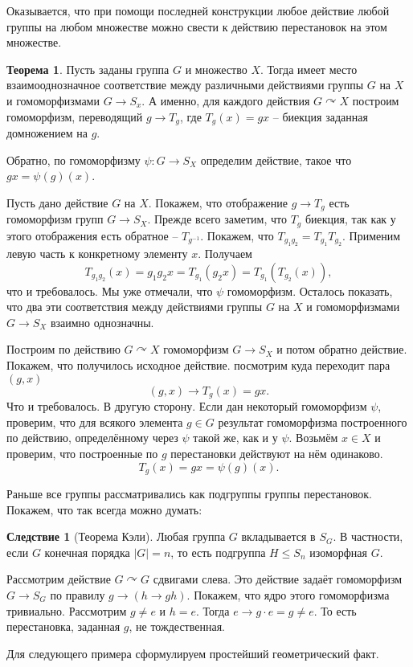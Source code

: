\documentclass[10pt,a4paper,oneside]{book}
\theoremstyle{definition}
\newtheorem{thm}{\color{red!40!black}Теорема}
\newtheorem{cor}{\color{green!45!black}Следствие}
\renewcommand{\leq}{\leqslant}
\def\thrm{\begin{thm}}
\def\ethrm{\end{thm}}
\def\crl{\begin{cor}}
\def\ecrl{\end{cor}}
\begin{document}
Оказывается, что при помощи последней конструкции любое действие любой группы на любом множестве можно свести к действию перестановок на этом множестве.


\thrm
Пусть заданы группа $G$ и множество $X$. Тогда имеет место взаимооднозначное соответствие между различными действиями группы $G$ на $X$ и  гомоморфизмами $G \to S_x$. А именно, для каждого действия $G \curvearrowright X$ построим гомоморфизм, переводящий $g \to T_g$, где $T_g(x)=gx$ -- биекция заданная домножением на $g$. 

Обратно, по гомоморфизму $\psi \colon G \to S_X$ определим действие, такое что $gx=\psi(g)(x)$.
\ethrm
\proof
Пусть дано действие $G$ на $X$. Покажем, что отображение $g \to T_g$ есть гомоморфизм групп $G \to S_X$.  Прежде всего заметим, что $T_g$ биекция, так как у этого отображения есть обратное -- $T_{g^{-1}}$. 
Покажем, что $T_{g_1g_2}=T_{g_1}T_{g_2}$. Применим  левую часть к конкретному элементу $x$. Получаем $$T_{g_1g_2}(x)=g_1g_2x=T_{g_1}(g_2x)=T_{g_1}(T_{g_2}(x)),$$
что и требовалось. Мы уже отмечали, что $\psi$ гомоморфизм. Осталось показать, что два эти соответствия между действиями группы $G$ на $X$ и гомоморфизмами $G \to S_X$ взаимно однозначны. 

Построим по действию $G \curvearrowright X$ гомоморфизм $G \to S_X$ и потом обратно действие. Покажем, что получилось исходное действие. посмотрим куда переходит пара $(g,x)$
$$(g,x) \to T_g(x)=gx.$$
Что и требовалось. В другую сторону. Если дан некоторый гомоморфизм $\psi$, проверим, что для всякого элемента $g\in G$ результат гомоморфизма построенного по действию, определённому через $\psi$ такой же, как и у $\psi$. Возьмём $x\in X$ и проверим, что построенные по $g$ перестановки действуют на нём одинаково. 
$$T_g(x)=gx=\psi(g)(x).$$
\endproof

Раньше все группы рассматривались как подгруппы группы перестановок. Покажем, что так всегда можно думать:

\crl[Теорема Кэли] Любая  группа $G$ вкладывается в $S_G$. В частности, если $G$ конечная порядка $|G|=n$, то есть подгруппа  $H \leq S_n$ изоморфная $G$.
\ecrl
\proof Рассмотрим действие $G \curvearrowright G$ сдвигами слева. Это действие задаёт гомоморфизм $G \to S_G$ по правилу $g\to (h \to gh)$. Покажем, что ядро этого гомоморфизма тривиально. Рассмотрим $g\neq e$ и $h=e$. Тогда $e \to g\cdot e=g \neq e$. То есть перестановка, заданная $g$, не тождественная. 
\endproof

Для следующего примера сформулируем простейший геометрический факт.
\end{document}
